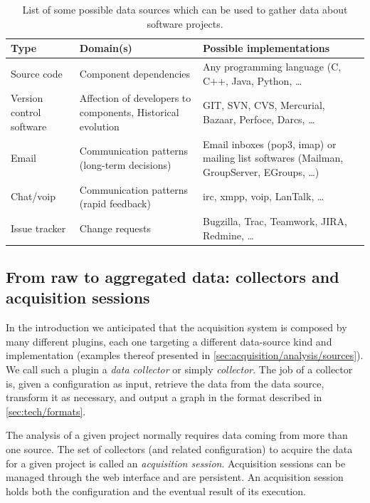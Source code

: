 \begin{table}
  \begin{tabularx}{\textwidth}{ p{2.3cm} | X | X }
    \toprule
    Type & Domain(s) & Possible implementations\\[.7mm]
    \hline

    Source code & Component dependencies & Any programming language (C, C++, Java, Python, \ldots \\[3mm]
    Version control software & Affection of developers to components, Historical evolution & GIT, SVN, CVS, Mercurial, Bazaar, Perfoce, Darcs, \ldots \\[3mm]
    Email & Communication patterns (long-term decisions) & Email inboxes (\gls{pop3}, \gls{imap}) or mailing list softwares (Mailman, GroupServer, EGroups, \ldots) \\[3mm]
    Chat/\gls{voip} & Communication patterns (rapid feedback) & \gls{irc}, \gls{xmpp}, \gls{voip}, LanTalk, \ldots \\[3mm]
    Issue tracker & Change requests & Bugzilla, Trac, Teamwork, JIRA, Redmine, \ldots \\

    \bottomrule
  \end{tabularx}

  \caption[Possible data source types, domains and implementations]{List of some possible data sources which can be used to gather data about software projects.}
  \label{tab:sources}
\end{table}

\subsection{From raw to aggregated data: collectors and acquisition sessions}

In the introduction we anticipated that the acquisition system is composed by many different plugins, each one targeting a different data-source kind and implementation (examples thereof presented in \vref{sec:acquisition/analysis/sources}). We call such a plugin a \emph{data collector} or simply \emph{collector}. The job of a collector is, given a configuration as input, retrieve the data from the data source, transform it as necessary, and output a graph in the format described in \vref{sec:tech/formats}.

The analysis of a given project normally requires data coming from more than one source. The set of collectors (and related configuration) to acquire the data for a given project is called an \emph{acquisition session}. Acquisition sessions can be managed through the web interface and are persistent. An acquisition session holds both the configuration and the eventual result of its execution.

